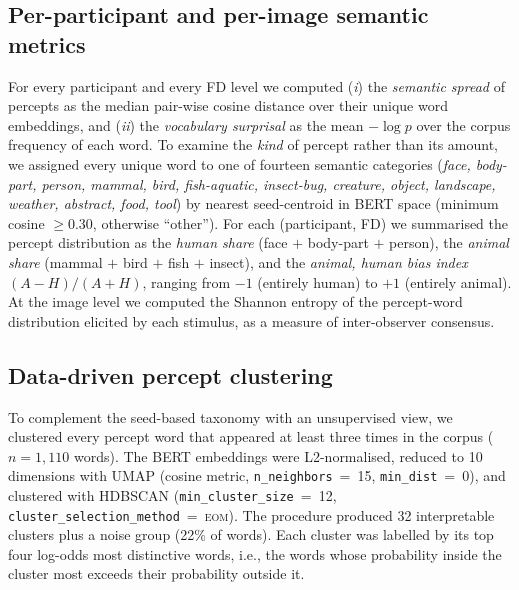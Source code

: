 \documentclass[11pt]{article}
\begin{document}
\subsection{Per-participant and per-image semantic metrics}
For every participant and every FD level we computed (\emph{i}) the
\emph{semantic spread} of percepts as the median pair-wise cosine
distance over their unique word embeddings, and (\emph{ii}) the
\emph{vocabulary surprisal} as the mean $-\log p$ over the corpus
frequency of each word. To examine the \emph{kind} of percept rather
than its amount, we assigned every unique word to one of fourteen
semantic categories (\emph{face, body-part, person, mammal, bird,
fish-aquatic, insect-bug, creature, object, landscape, weather,
abstract, food, tool}) by nearest seed-centroid in BERT space
(minimum cosine $\geq 0.30$, otherwise ``other''). For each
(participant, FD) we summarised the percept distribution as the
\emph{human share} (face $+$ body-part $+$ person), the
\emph{animal share} (mammal $+$ bird $+$ fish $+$ insect), and the
\emph{animal, human bias index} $(A - H) / (A + H)$, ranging from
$-1$ (entirely human) to $+1$ (entirely animal). At the image level
we computed the Shannon entropy of the percept-word distribution
elicited by each stimulus, as a measure of inter-observer consensus.

\subsection{Data-driven percept clustering}
To complement the seed-based taxonomy with an unsupervised view, we
clustered every percept word that appeared at least three times in the
corpus ($n = 1{,}110$ words). The BERT embeddings were
L2-normalised, reduced to 10 dimensions with UMAP (cosine metric,
\texttt{n\_neighbors}~=~15, \texttt{min\_dist}~=~0), and clustered
with HDBSCAN (\texttt{min\_cluster\_size}~=~12,
\texttt{cluster\_selection\_method}~=~\textsc{eom}). The procedure
produced 32 interpretable clusters plus a noise group (22\% of words).
Each cluster was labelled by its top four log-odds most distinctive
words, i.e., the words whose probability inside the cluster most
exceeds their probability outside it.
\end{document}
